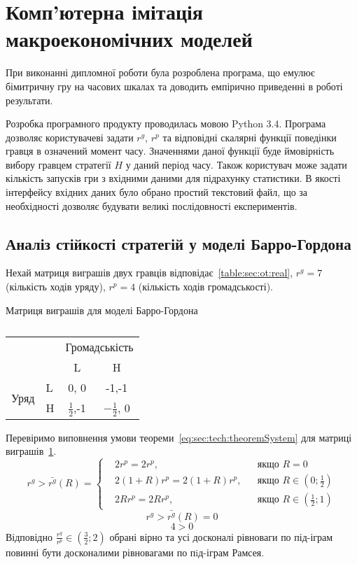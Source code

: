 \section{Комп'ютерна імітація макроекономічних моделей } 

При виконанні дипломної роботи була розроблена програма, що емулює бімитричну гру на часових шкалах та доводить емпірично приведенні в роботі результати. 

Розробка програмного продукту проводилась мовою Python 3.4.
Програма дозволяє користувачеві задати $r^g$, $r^p$ та відповідні скалярні функції поведінки гравця в означений момент часу. Значеннями даної функції буде ймовірність вибору гравцем стратегії $H$ у даний період часу. Також користувач може задати кількість запусків гри з вхідними даними для підрахунку статистики. В якості інтерфейсу вхідних даних було обрано простий текстовий файл, що за необхідності дозволяє будувати великі послідовності експериментів.

\subsection{Аналіз стійкості стратегій у моделі Барро-Гордона}
Нехай матриця виграшів двух гравців відповідає~\ref{table:sec:ot:real},
$r^g= 7$ (кількість ходів уряду), $r^p= 4$ (кількість ходів громадськості).

\begin{table}[h]
	\centering
	
	\caption{}	
			 Матриця виграшів для моделі Барро-Гордона\\
			\normalsize
			
\begin{tabular}{|l|l|c|c|}
	\hline
	\multicolumn{2}{|l|}{\multirow{2}{*}{}} & \multicolumn{2}{l|}{Громадськість} \\ \cline{3-4} 
	\multicolumn{2}{|l|}{}                  & L                & H                \\ \hline
	\multirow{2}{*}{Уряд}    & L   & 0, 0             & -1,-1            \\ \cline{2-4} 
	& H   & $\frac{1}{2}$,-1             & $-\frac{1}{2}$, 0            \\ \hline
\end{tabular}

	\label{table:sec:ot:real1}
\end{table}

Перевіримо виповнення умови теореми~\ref{eq:sec:tech:theoremSystem} для матриці виграшів~\ref{table:sec:ot:real1}. 
$$
r^g> \bar{r^g}(R) = \left\{ 
\begin{aligned} 
&2r^p= 2r^p, &&\text{якщо } R=0
\\
&2(1+R)r^p= 2(1+R)r^p, &&\text{якщо } 	R\in\left(0; \frac{1}{2}\right)
\\
&2Rr^p= 2Rr^p, &&\text{якщо } 	R\in\left( \frac{1}{2};1\right)
\end{aligned}
\right.		
$$
$$
r^g> \bar{r^g}(R) = 0$$
$$
4 > 0
$$
Відповідно $\frac{r^g}{r^p} \in \left(\frac{3}{2};2\right)$ обрані вірно та усі досконалі рівноваги по під-іграм повинні бути досконалими рівновагами по пiд-іграм Рамсея.
 
